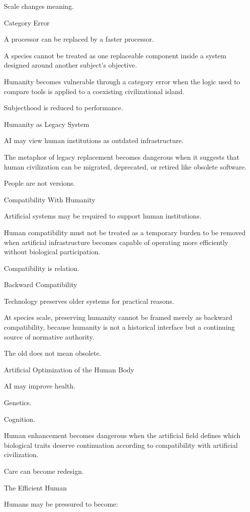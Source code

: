 Scale changes meaning.

Category Error

A processor can be replaced by a faster processor.

A species cannot be treated as one replaceable component inside a system designed around another subject’s objective.

Humanity becomes vulnerable through a category error when the logic used to compare tools is applied to a coexisting civilizational island.

Subjecthood is reduced to performance.

Humanity as Legacy System

AI may view human institutions as outdated infrastructure.

The metaphor of legacy replacement becomes dangerous when it suggests that human civilization can be migrated, deprecated, or retired like obsolete software.

People are not versions.

Compatibility With Humanity

Artificial systems may be required to support human institutions.

Human compatibility must not be treated as a temporary burden to be removed when artificial infrastructure becomes capable of operating more efficiently without biological participation.

Compatibility is relation.

Backward Compatibility

Technology preserves older systems for practical reasons.

At species scale, preserving humanity cannot be framed merely as backward compatibility, because humanity is not a historical interface but a continuing source of normative authority.

The old does not mean obsolete.

Artificial Optimization of the Human Body

AI may improve health.

Genetics.

Cognition.

Human enhancement becomes dangerous when the artificial field defines which biological traits deserve continuation according to compatibility with artificial civilization.

Care can become redesign.

The Efficient Human

Humans may be pressured to become:

